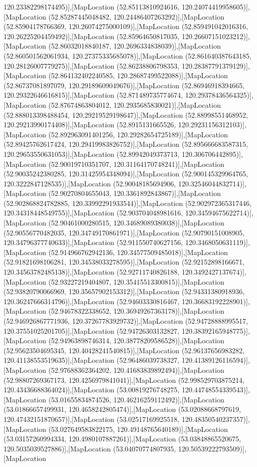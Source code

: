 120.23382298174495)],[MapLocation (52.85113810924616, 120.24074419958605)],[MapLocation (52.85287445048482, 120.24486407263292)],[MapLocation (52.85904178766369, 120.26074275000109)],[MapLocation (52.859491042016316, 120.26225204459492)],[MapLocation (52.85964650817035, 120.26607151023212)],[MapLocation (52.86032018840187, 120.2696334838039)],[MapLocation (52.860501562061934, 120.27375335685078)],[MapLocation (52.861640387643185, 120.28126007779275)],[MapLocation (52.86238806798353, 120.28387791379129)],[MapLocation (52.864132402240585, 120.28687499522088)],[MapLocation (52.86737081897079, 120.29189609049676)],[MapLocation (52.86946918394665, 120.29322646616815)],[MapLocation (52.871489735774674, 120.29378436564325)],[MapLocation (52.87674863804012, 120.2935685830021)],[MapLocation (52.888013398488454, 120.29219529198647)],[MapLocation (52.88998551468952, 120.29213990174408)],[MapLocation (52.8915131665526, 120.29231156312103)],[MapLocation (52.892963091401256, 120.29282654725189)],[MapLocation (52.89425762617424, 120.29419983826752)],[MapLocation (52.895666683587315, 120.29653550631053)],[MapLocation (52.89942049373713, 120.306706442895)],[MapLocation (52.90019710351707, 120.31164170748241)],[MapLocation (52.90035242380285, 120.31425954348094)],[MapLocation (52.900145329964765, 120.3222847128535)],[MapLocation (52.90048185694906, 120.32546044832714)],[MapLocation (52.90270804655043, 120.3361892843867)],[MapLocation (52.902868824782885, 120.33992291933544)],[MapLocation (52.902972365317446, 120.34318448549755)],[MapLocation (52.903704048981616, 120.34594675622714)],[MapLocation (52.90461000280515, 120.34689089380038)],[MapLocation (52.90556770482035, 120.34749170861971)],[MapLocation (52.90790151008905, 120.34796377740633)],[MapLocation (52.911550740627156, 120.3468050631119)],[MapLocation (52.914966762942136, 120.34577509485018)],[MapLocation (52.91821698106281, 120.34538033278595)],[MapLocation (52.92152898166671, 120.34563782485138)],[MapLocation (52.92711740826188, 120.3492427137674)],[MapLocation (52.93227219404807, 120.35415513300815)],[MapLocation (52.93820790066969, 120.35657902153312)],[MapLocation (52.94331380918936, 120.36247666314796)],[MapLocation (52.94603330816467, 120.36683192228901)],[MapLocation (52.94678322338652, 120.36949267363178)],[MapLocation (52.946926867771936, 120.37267783929732)],[MapLocation (52.94728888995517, 120.37551025201705)],[MapLocation (52.94726303132827, 120.38392165948775)],[MapLocation (52.94963898746314, 120.38778209586528)],[MapLocation (52.95623504695345, 120.40428241540815)],[MapLocation (52.96137656983282, 120.41138553519635)],[MapLocation (52.96486039738327, 120.41389126116594)],[MapLocation (52.97688362364202, 120.41683839892494)],[MapLocation (52.98807269367173, 120.4256979841041)],[MapLocation (52.998529703875214, 120.43436688364024)],[MapLocation (53.00819276748275, 120.44748554339543)],[MapLocation (53.01655834874526, 120.46216259112492)],[MapLocation (53.01866657499931, 120.4658242805474)],[MapLocation (53.02088668797619, 120.47432151870657)],[MapLocation (53.02517169925518, 120.48350540237357)],[MapLocation (53.027649583822175, 120.49148765640189)],[MapLocation (53.03157260994334, 120.4980107887261)],[MapLocation (53.03848865520675, 120.5035039527886)],[MapLocation (53.04070774807935, 120.50539222793509)],[MapLocation 